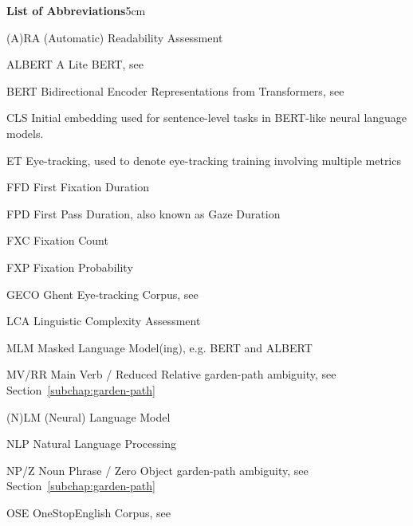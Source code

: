 \begin{mclistof}{\textbf{List of Abbreviations}}{5cm}

\item[(A)RA] (Automatic) Readability Assessment

\item[ALBERT] A Lite BERT, see \cite{lan-etal-2020-albert}

\item[BERT] Bidirectional Encoder Representations from Transformers, see \cite{devlin-etal-2019-bert}

\item[CLS] Initial embedding used for sentence-level tasks in BERT-like neural language models.

\item[ET] Eye-tracking, used to denote eye-tracking training involving multiple metrics

\item[FFD] First Fixation Duration

\item[FPD] First Pass Duration, also known as Gaze Duration

\item[FXC] Fixation Count

\item[FXP] Fixation Probability

\item[GECO] Ghent Eye-tracking Corpus, see \cite{cop-etal-2017-presenting}

\item[LCA] Linguistic Complexity Assessment

\item[MLM] Masked Language Model(ing), e.g. BERT and ALBERT

\item[MV/RR] Main Verb / Reduced Relative garden-path ambiguity, see Section~\ref{subchap:garden-path}

\item[(N)LM] (Neural) Language Model

\item[NLP] Natural Language Processing

\item[NP/Z] Noun Phrase / Zero Object garden-path ambiguity, see Section~\ref{subchap:garden-path}

\item[OSE] OneStopEnglish Corpus, see \cite{vajjala-lucic-2018-onestopenglish}


\end{mclistof}
